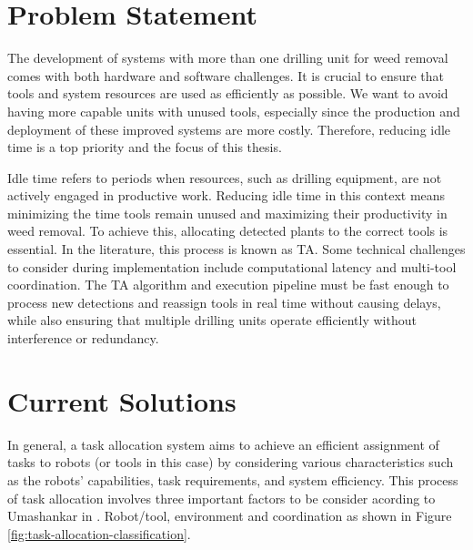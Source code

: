 \section{Problem Statement}

The development of systems with more than one drilling unit for weed removal comes with both hardware and software challenges. It is crucial to ensure that tools and system resources are used as efficiently as possible. We want to avoid having more capable units with unused tools, especially since the production and deployment of these improved systems are more costly. Therefore, reducing idle time is a top priority and the focus of this thesis.


Idle time refers to periods when resources, such as drilling equipment, are not actively engaged in productive work. Reducing idle time in this context means minimizing the time tools remain unused and maximizing their productivity in weed removal. To achieve this, allocating detected plants to the correct tools is essential. In the literature, this process is known as \ac{TA}. Some technical challenges to consider during implementation include computational latency and multi-tool coordination. The \ac{TA} algorithm and execution pipeline must be fast enough to process new detections and reassign tools in real time without causing delays, while also ensuring that multiple drilling units operate efficiently without interference or redundancy.

\section{Current Solutions}

In general, a task allocation system aims to achieve an efficient assignment of tasks to robots (or tools in this case) by considering various characteristics such as the robots' capabilities, task requirements, and system efficiency. This process of task allocation involves three important factors to be consider acording to Umashankar in \cite{10.1145/3700591}. Robot/tool, environment and coordination as shown in Figure \ref{fig:task-allocation-classification}. 

